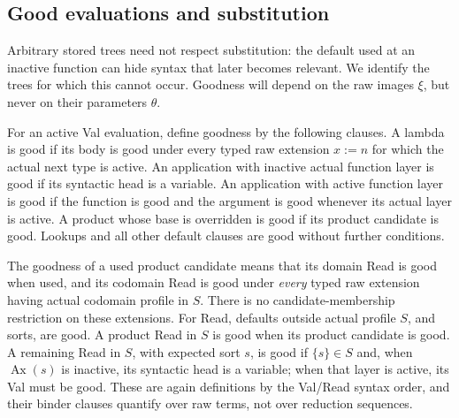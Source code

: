 \subsection{Good evaluations and substitution}
\label{obs:goodness}

Arbitrary stored trees need not respect substitution: the default used
at an inactive function can hide syntax that later becomes relevant.
We identify the trees for which this cannot occur.  Goodness will
depend on the raw images $\xi$, but never on their parameters $\theta$.

For an active Val evaluation, define goodness by the following clauses.
A lambda is good if its body is good under every typed raw extension
$x:=n$ for which the actual next type is active.  An application with
inactive actual function layer is good if its syntactic head is a
variable.  An application with active function layer is good if the
function is good and the argument is good whenever its actual layer is
active.  A product whose base is overridden is good if its product
candidate is good.  Lookups and all other default clauses are good
without further conditions.

The goodness of a used product candidate means that its domain Read is
good when used, and its codomain Read is good under \emph{every} typed
raw extension having actual codomain profile in $S$.  There is no
candidate-membership restriction on these extensions.  For Read,
defaults outside actual profile $S$, and sorts, are good.  A product
Read in $S$ is good when its product candidate is good.  A remaining
Read in $S$, with expected sort $s$, is good if $\{s\}\in S$ and,
when $\operatorname{Ax}(s)$ is inactive, its syntactic head is a
variable; when that layer is active, its Val must be good.
These are again definitions by the Val/Read syntax order, and their
binder clauses quantify over raw terms, not over reduction sequences.

